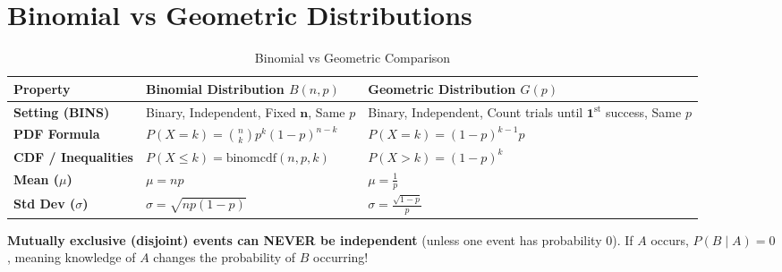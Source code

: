 \section{Binomial vs Geometric Distributions}

\begin{table}[H]
\centering
\small
\begin{tabular}{@{}lll@{}}
\toprule
\textbf{Property} & \textbf{Binomial Distribution} $B(n, p)$ & \textbf{Geometric Distribution} $G(p)$ \\
\midrule
\textbf{Setting (BINS)} & Binary, Independent, Fixed $\mathbf{n}$, Same $p$ & Binary, Independent, Count trials until $\mathbf{1}^{\text{st}}$ success, Same $p$ \\
\textbf{PDF Formula} & $P(X = k) = \binom{n}{k} p^k (1-p)^{n-k}$ & $P(X = k) = (1-p)^{k-1} p$ \\
\textbf{CDF / Inequalities} & $P(X \le k) = \text{binomcdf}(n, p, k)$ & $P(X > k) = (1-p)^k$ \\
\textbf{Mean ($\mu$)} & $\mu = np$ & $\mu = \frac{1}{p}$ \\
\textbf{Std Dev ($\sigma$)} & $\sigma = \sqrt{np(1-p)}$ & $\sigma = \frac{\sqrt{1-p}}{p}$ \\
\bottomrule
\end{tabular}
\caption{Binomial vs Geometric Comparison}
\end{table}

\begin{trapbox}
\textbf{Mutually exclusive (disjoint) events can NEVER be independent} (unless one event has probability 0). If $A$ occurs, $P(B \mid A) = 0$, meaning knowledge of $A$ changes the probability of $B$ occurring!
\end{trapbox}

